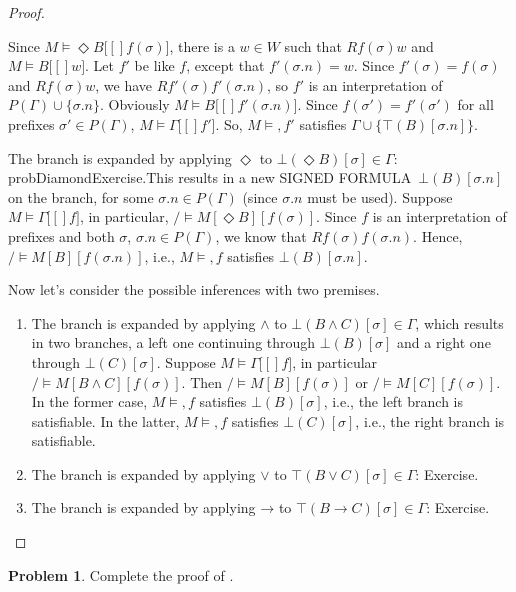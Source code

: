 \documentclass[10pt,a4paper]{article}
\makeatletter
\newcommand*{\olup}[1]{\MakeUppercase{#1}}
\theoremstyle{plain}
\theoremstyle{definition}
\newtheorem{prob}{Problem}[section]
\theoremstyle{remark}
\newcommand{\olref}{\@ifnextchar[{\olref@i}{\olref@final}}
\def\olref@i[#1]{\@ifnextchar[{\olref@ii}{\olref@final}}
\def\olref@ii[#1]{\@ifnextchar[{\olref@iii}{\olref@final}}
\def\olref@iii[#1]{\olref@final}
\def\olref@final#1{\ref{#1}}
\providecommand{\lif}{\mathbin{\rightarrow}}
\providecommand{\sFmla}[2]{#1(#2)}
\providecommand{\True}{\top}
\providecommand{\False}{\bot}
\providecommand{\mSat}[3]{\ensuremath{#1 \models #2[#3]}}
\providecommand{\mModel}[2]{\ensuremath{#1 \models #2}}
\providecommand{\iftag}[1]{#1}
\providecommand{\TRule}[1]{}
\providecommand{\iftag}{}
\makeatother
\begin{document}
\begin{proof}
\begin{enumerate}
{{  Since $\mSat{M}{\Diamond B}[f(\sigma)]$, there is a $w \in W$ such that
  $Rf(\sigma)w$ and $\mSat{M}{B}[w]$. Let $f'$ be like $f$, except
  that $f'(\sigma.n) = w$. Since $f'(\sigma) = f(\sigma)$ and
  $Rf(\sigma)w$, we have $Rf'(\sigma)f'(\sigma.n)$, so $f'$ is an
  interpretation of $P(\Gamma) \cup \{\sigma.n\}$.  Obviously
  $\mSat{M}{B}[f'(\sigma.n)]$. Since $f(\sigma') = f'(\sigma')$ for
  all prefixes $\sigma' \in P(\Gamma)$, $\mSat{M}{\Gamma}[f']$.  So,
  $\mModel{M}, f'$ satisfies $\Gamma \cup
  \{\sFmla{\True}{B}[\sigma.n]\}$.}
\item The branch is expanded by applying $\TRule{\False}{\Diamond}$ to
  $\sFmla{\False}{\Diamond B}[\sigma] \in \Gamma$:
  \iftag{probDiamond}{Exercise.}{This results in a new \olup{signed
      formula}~$\sFmla{\False}{B}[\sigma.n]$ on the branch, for some
    $\sigma.n \in P(\Gamma)$ (since $\sigma.n$ must be used).  Suppose
    $\mSat{M}{\Gamma}[f]$, in particular, $\mSat/{M}{\Diamond
      B}[f(\sigma)]$. Since $f$ is an interpretation of prefixes and
    both $\sigma$, $\sigma.n \in P(\Gamma)$, we know that
    $Rf(\sigma)f(\sigma.n)$.  Hence, $\mSat/{M}{B}[f(\sigma.n)]$,
    i.e., $\mModel{M}, f$ satisfies $\sFmla{\False}{B}[\sigma.n]$.}
  }{}
\end{enumerate}
Now let's consider the possible inferences with two premises.
\begin{enumerate}
\item The branch is expanded by applying $\TRule{\False}{\land}$ to
  $\sFmla{\False}{B \land C}[\sigma] \in \Gamma$, which results in
  two branches, a left one continuing through
  $\sFmla{\False}{B}[\sigma]$ and a right one through
  $\sFmla{\False}{C}[\sigma]$. Suppose $\mSat{M}{\Gamma}[f]$, in
  particular $\mSat/{M}{B \land C}[f(\sigma)]$.  Then
  $\mSat/{M}{B}[f(\sigma)]$ or $\mSat/{M}{C}[f(\sigma)]$. In the
  former case, $\mModel{M}, f$ satisfies $\sFmla{\False}{B}[\sigma]$,
  i.e., the left branch is satisfiable. In the latter, $\mModel{M}, f$
  satisfies $\sFmla{\False}{C}[\sigma]$, i.e., the right branch is
  satisfiable.
\item The branch is expanded by applying $\TRule{\True}{\lor}$ to
    $\sFmla{\True}{B \lor C}[\sigma] \in \Gamma$: Exercise.
\item The branch is expanded by applying $\TRule{\True}{\lif}$ to
    $\sFmla{\True}{B \lif C}[\sigma] \in \Gamma$: Exercise.
\end{enumerate}
\end{proof}

\begin{prob}
Complete the proof of \olref[nml][tab][sou]{thm:tableau-soundness}.
\end{prob}
\end{document}
